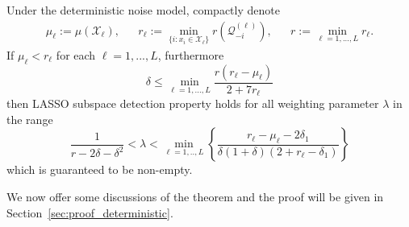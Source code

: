 \documentclass[twoside,11pt]{article}
\numberwithin{equation}{section}
\begin{document}
\begin{theorem}\label{thm:thm_general}
Under the deterministic noise model, compactly denote
\begin{align*}
\mu_{\ell}:=\mu(\mathcal{X}_{\ell}),&& r_{\ell}:=\min_{\{i: x_i\in \mathcal{X}_{\ell}\}}r(\mathcal{Q}^{(\ell)}_{-i}),&&
   r:=\min_{\ell=1,...,L} r_{\ell}.
\end{align*}
If $\mu_{\ell}< r_{\ell}$ for each $\ell = 1,...,L$, furthermore
$$ \delta\leq \min_{\ell=1,...,L}\frac{r(r_{\ell}-\mu_{\ell})}{2+7r_{\ell}} $$
then LASSO subspace detection property holds for all weighting parameter $\lambda$ in the range
\begin{equation*}
\frac{1}{r - 2\delta-\delta^2}<
        \lambda<\min_{\ell=1,..,L}\left\{\frac{r_{\ell}-\mu_{\ell}-2\delta_1}{\delta(1+\delta)(2+r_{\ell}-\delta_1)}\right\}
\end{equation*}
which is guaranteed to be non-empty.
\end{theorem}
We now offer some discussions of the theorem and the proof will be given in  Section~\ref{sec:proof_deterministic}.
\end{document}
